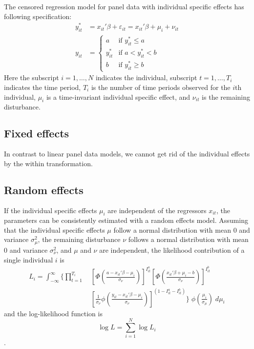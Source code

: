 \documentclass[article,nojss]{jss}
\newcommand{\dnorm}{\phi}%
\newcommand{\pnorm}{\Phi}%
\begin{document}
The censored regression model for panel data
with individual specific effects has following specification:
\begin{align}
y_{it}^* &= x_{it} ' \beta + \varepsilon_{it} =  x_{it} ' \beta + \mu_{i} + \nu_{it} \\
y_{it} &=
   \begin{cases}
   a        & \text{if } y_{it}^* \leq a\\
   y_{it}^* & \text{if } a < y_{it}^* < b\\
   b        & \text{if } y_{it}^* \geq b
   \end{cases}
\end{align}
Here the subscript $i = 1, \ldots , N$ indicates the individual,
subscript $t = 1, \ldots , T_i$ indicates the time period,
$T_i$ is the number of time periods observed for the $i$th individual,
$\mu_i$ is a time-invariant individual specific effect,
and $\nu_{it}$ is the remaining disturbance.


\subsection{Fixed effects}

In contrast to linear panel data models,
we cannot get rid of the individual effects by the within transformation.


\subsection{Random effects}

If the individual specific effects $\mu_i$ are independent
of the regressors $x_{it}$,
the parameters can be consistently estimated with a random effects model.
Assuming
that the individual specific effects $\mu$ follow a normal distribution
with mean $0$ and variance $\sigma_\mu^2$,
the remaining disturbance $\nu$ follows a normal distribution
with mean $0$ and variance $\sigma_\nu^2$, and
$\mu$ and $\nu$ are independent,
the likelihood contribution of a single individual $i$ is
\begin{align}
L_i  = \int_{-\infty}^\infty
   \Bigg\{ \prod_{t=1}^{T_i} \;&
      \left[
         \pnorm \left( \frac{ a - x_{it} ' \beta - \mu_i }{ \sigma_\nu } \right)
      \right]^{I_{it}^a}
      \left[
         \pnorm \left( \frac{ x_{it} ' \beta + \mu_i - b }{ \sigma_\nu } \right)
      \right]^{I_{it}^b}
      \label{eq:likRandom}\\
      & \left[
         \frac{1}{\sigma_\nu}
         \dnorm \left( \frac{ y_{it} - x_{it} ' \beta - \mu_i }{ \sigma_\nu } \right)
      \right]^{\left( 1 - I_{it}^a - I_{it}^b \right)}
   \Bigg\} \; \dnorm \left( \frac{\mu_i}{\sigma_\mu} \right) \; d \mu_i
      \nonumber
\end{align}
and the log-likelihood function is
\begin{equation}
\log L = \sum_{i=1}^N \log L_i
\end{equation}
\citep[see][p.~2]{bruno04}.
\end{document}
